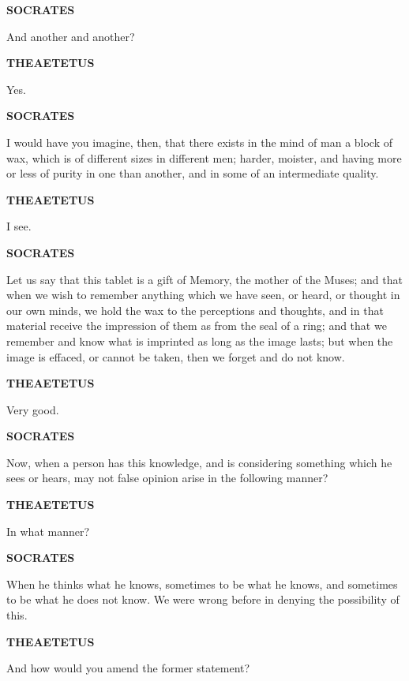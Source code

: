 \documentclass[11pt,letter]{article}
\begin{document}
\par \textbf{SOCRATES}
\par   And another and another?

\par \textbf{THEAETETUS}
\par   Yes.

\par \textbf{SOCRATES}
\par   I would have you imagine, then, that there exists in the mind of man a block of wax, which is of different sizes in different men; harder, moister, and having more or less of purity in one than another, and in some of an intermediate quality.

\par \textbf{THEAETETUS}
\par   I see.

\par \textbf{SOCRATES}
\par   Let us say that this tablet is a gift of Memory, the mother of the Muses; and that when we wish to remember anything which we have seen, or heard, or thought in our own minds, we hold the wax to the perceptions and thoughts, and in that material receive the impression of them as from the seal of a ring; and that we remember and know what is imprinted as long as the image lasts; but when the image is effaced, or cannot be taken, then we forget and do not know.

\par \textbf{THEAETETUS}
\par   Very good.

\par \textbf{SOCRATES}
\par   Now, when a person has this knowledge, and is considering something which he sees or hears, may not false opinion arise in the following manner?

\par \textbf{THEAETETUS}
\par   In what manner?

\par \textbf{SOCRATES}
\par   When he thinks what he knows, sometimes to be what he knows, and sometimes to be what he does not know. We were wrong before in denying the possibility of this.

\par \textbf{THEAETETUS}
\par   And how would you amend the former statement?
\end{document}
